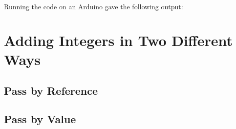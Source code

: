 \documentclass{hw}
\begin{document}
Running the code on an Arduino gave the following output:
\section{Adding Integers in Two Different Ways}
\subsection{Pass by Reference}

\subsection{Pass by Value}
\end{document}

